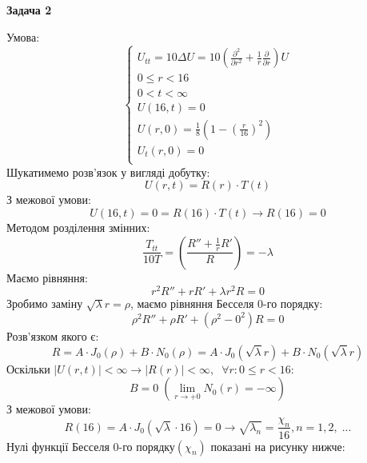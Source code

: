 \documentclass[]{article}
\begin{document}
\newpage
\begin{center}
    \textbf{Задача 2}
\end{center}
Умова:
\begin{equation*}
    \begin{cases}
      U_{tt}=10\Delta U = 10\left(\frac{\partial^2}{\partial r^2}+\frac{1}{r}\frac{\partial}{\partial r}\right)U\\
      0\leq r<16\\
      0<t<\infty\\
      U(16,t) = 0\\
      U(r,0) = \frac{1}{8}\left(1-\left(\frac{r}{16}\right)^2\right)\\
      U_t(r,0) = 0\\
    \end{cases}
\end{equation*}
Шукатимемо розв'язок у вигляді добутку:
\[U(r,t) = R(r)\cdot T(t)\]
З межової умови:
\[U(16,t)=0=R(16)\cdot T(t)\rightarrow R(16)=0\]
Методом розділення змінних:
\[\frac{T_{tt}}{10T}=\left(\frac{R''+\frac{1}{r}R'}{R}\right)=-\lambda\]
Маємо рівняння:
\[r^2R''+rR'+\lambda r^2R=0\]
Зробимо заміну $\sqrt{\lambda} r = \rho$, маємо рівняння Бесселя 0-го порядку:
\[\rho^2R''+\rho R'+\left(\rho^2-0^2\right)R=0\]
Розв'язком якого є:
\[R = A\cdot J_0(\rho)+B\cdot N_0(\rho) = A\cdot J_0(\sqrt{\lambda}r)+B\cdot N_0(\sqrt{\lambda}r) \]
Оскільки $\big|U(r,t)\big|<\infty\rightarrow\big|R(r)\big|<\infty,\;\;\forall r: 0\leq r<16$:
\[B = 0\;\left(\lim_{r\rightarrow +0} N_0(r) = -\infty\right)\]
З межової умови:
\[R(16) = A\cdot J_0(\sqrt{\lambda}\cdot 16) = 0 \rightarrow \sqrt{\lambda_n} = \frac{\chi_n}{16}, n = 1,2,\;...\]
\newpage
Нулі функції Бесселя 0-го порядку$\left(\chi_n\right)$ показані на рисунку нижче:
\begin{figure}[!h]
    \label{fig:flow}
\end{figure}
\end{document}
